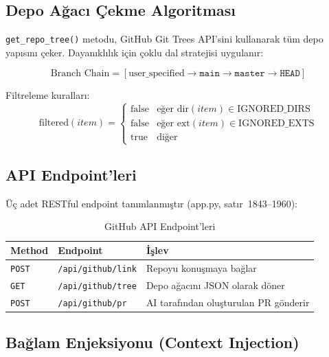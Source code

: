 \documentclass[12pt,a4paper]{article}
\begin{document}
\subsection{Depo Ağacı Çekme Algoritması}

\texttt{get\_repo\_tree()} metodu, GitHub Git Trees API'sini kullanarak tüm depo yapısını çeker. Dayanıklılık için çoklu dal stratejisi uygulanır:

\begin{equation}
    \text{Branch Chain} = [\text{user\_specified} \rightarrow \texttt{main} \rightarrow \texttt{master} \rightarrow \texttt{HEAD}]
\end{equation}

Filtreleme kuralları:
\begin{equation}
    \text{filtered}(item) = \begin{cases} \text{false} & \text{eğer } \text{dir}(item) \in \text{IGNORED\_DIRS} \\ \text{false} & \text{eğer } \text{ext}(item) \in \text{IGNORED\_EXTS} \\ \text{true} & \text{diğer} \end{cases}
\end{equation}

\subsection{API Endpoint'leri}

Üç adet RESTful endpoint tanımlanmıştır (app.py, satır~1843--1960):

\begin{table}[H]
\centering
\caption{GitHub API Endpoint'leri}
\label{tab:ghapi}
\begin{tabular}{@{}llp{6cm}@{}}
\toprule
\textbf{Method} & \textbf{Endpoint} & \textbf{İşlev} \\
\midrule
\texttt{POST} & \texttt{/api/github/link} & Repoyu konuşmaya bağlar \\
\texttt{GET} & \texttt{/api/github/tree} & Depo ağacını JSON olarak döner \\
\texttt{POST} & \texttt{/api/github/pr} & AI tarafından oluşturulan PR gönderir \\
\bottomrule
\end{tabular}
\end{table}

\subsection{Bağlam Enjeksiyonu (Context Injection)}
\end{document}
